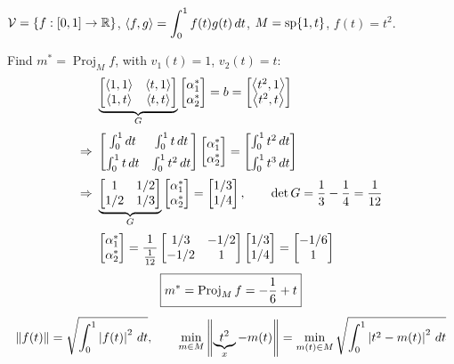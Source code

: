 \begin{example}
$\mathcal{V} = \{f:[0,1]\to\mathbb{R}\}$, \quad $\displaystyle\left\langle f, g \right\rangle = \int_0^1 f(t)g(t)\,dt$, \quad
$M=\operatorname{sp}\{1,t\}$, \quad $f(t)=t^2$.

Find $m^* = \operatorname{Proj}_M f$, with $v_1(t) = 1$, $v_2(t) = t$:
\begin{align*}
&\underbrace{\begin{bmatrix}\left\langle 1, 1 \right\rangle & \left\langle t, 1 \right\rangle\\ \left\langle 1, t \right\rangle & \left\langle t, t \right\rangle\end{bmatrix}}_{G}\begin{bmatrix}\alpha_1^*\\ \alpha_2^*\end{bmatrix} = b = \begin{bmatrix}\left\langle t^2, 1 \right\rangle\\ \left\langle t^2, t \right\rangle\end{bmatrix}\\[2pt]
\Rightarrow\ &\begin{bmatrix}\int_0^1 dt & \int_0^1 t\,dt\\[4pt] \int_0^1 t\,dt & \int_0^1 t^2\,dt\end{bmatrix}\begin{bmatrix}\alpha_1^*\\ \alpha_2^*\end{bmatrix} = \begin{bmatrix}\int_0^1 t^2\,dt\\[4pt] \int_0^1 t^3\,dt\end{bmatrix}\\[2pt]
\Rightarrow\ &\underbrace{\begin{bmatrix}1 & 1/2\\ 1/2 & 1/3\end{bmatrix}}_{G}\begin{bmatrix}\alpha_1^*\\ \alpha_2^*\end{bmatrix} = \begin{bmatrix}1/3\\ 1/4\end{bmatrix},
\qquad \det G = \frac13 - \frac14 = \frac1{12}\\[2pt]
&\begin{bmatrix}\alpha_1^*\\ \alpha_2^*\end{bmatrix} = \frac{1}{\frac{1}{12}}\begin{bmatrix}1/3 & -1/2\\ -1/2 & 1\end{bmatrix}\begin{bmatrix}1/3\\ 1/4\end{bmatrix} = \begin{bmatrix}-1/6\\ 1\end{bmatrix}
\end{align*}
\begin{gather*}
\boxed{m^* = \operatorname{Proj}_M f = -\frac16 + t}\\[4pt]
\left\lVert f(t) \right\rVert = \sqrt{\int_0^1 \left\lvert f(t) \right\rvert^2\,dt}, \qquad
\min_{m\in M} \left\lVert \underbrace{t^2}_{x} - m(t) \right\rVert =
\min_{m(t)\in M} \sqrt{\int_0^1 \left\lvert t^2-m(t) \right\rvert^2\,dt}
\end{gather*}
\begin{center}
\end{center}
\end{example}
